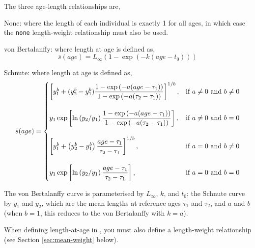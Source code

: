The three age-length relationships are,

\begin{description}
\item {None:} where the length of each individual is exactly 1 for all ages, in which case the \texttt{none} length-weight relationship must also be used.
\item{von Bertalanffy:} where length at age is defined as,
\begin{equation} 
\bar{s}(age)= L_\infty \left( 1 - \exp \left( -k \left(age-t_0 \right) \right) \right)
\end{equation}

\item{Schnute:} where length at age is defined as,
\begin{equation}
\bar{s}(age)=\displaystyle\begin{cases}
  \left[ y_1^b + (y_2^b - y_1^b) \dfrac{1-\exp \left(-a(age - \tau_1) \right)}{1-\exp \left(-a(\tau_2 - \tau_1) \right)} \right]^{1/b}, & \text{if $a\ne0$ and $b\ne0$} \\
  \AddVspace
  y_1 \exp \left[ \ln \left( y_2 / y_1 \right) \dfrac{1-\exp \left(-a(age - \tau_1) \right)}{1-\exp \left(-a(\tau_2 - \tau_1) \right)} \right], & \text{if $a\ne0$ and $b=0$} \\
  \AddVspace
  \left[ y_1^b + \left( y_2^b - y_1^b \right) \dfrac{age-\tau_1}{\tau_2 - \tau_1} \right]^{1/b}, & \text{if $a=0$ and $b\ne0$} \\
  \AddVspace
  y_1 \exp \left[ \ln \left( y_2/y_1 \right) \dfrac{age-\tau_1}{\tau_2 - \tau_1} \right] , & \text{if $a=0$ and $b=0$} \\
  \end{cases}
\end{equation}
\end{description}

The von Bertalanffy curve is parameterised by $L_\infty$, $k$, and $t_0$; the Schnute curve \citep{836} by $y_1$ and $y_2$, which are the mean lengths at reference ages $\tau_1$ and $\tau_2$, and $a$ and $b$ (when $b=1$, this reduces to the von Bertalanffy with $k=a$). 

When defining length-at-age in \CNAME, you must also define a length-weight relationship (see Section \ref{sec:mean-weight} below).

\subsubsection*{}

